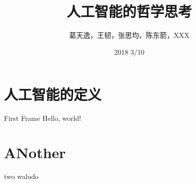 \documentclass{beamer}
\title{人工智能的哲学思考}
\date{2018 3/10}
\author{葛天逸，王韧，张思均，陈东箭，XXX}
\institute{马克思主义基本原理概论课堂讨论 \\
 \tiny{交大密西根学院}}
\begin{document}
  \maketitle
  \tableofcontents
  \section{人工智能的定义}
  \begin{frame}{First Frame}
    Hello, world!
  \end{frame}
  \section{ANother }
  \begin{frame}{two}
	waludo
  \end{frame}
  
\end{document}
